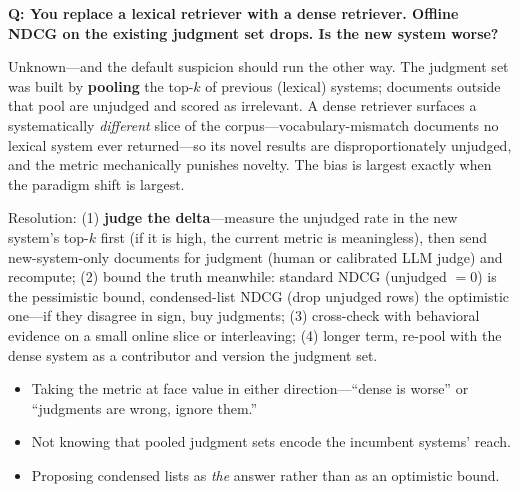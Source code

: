 \begin{interviewq}
\textbf{Q: You replace a lexical retriever with a dense retriever. Offline NDCG on the existing judgment set drops. Is the new system worse?}

 \quad {} \quad \badgefreq{\freqmed}

\stronganswer

Unknown---and the default suspicion should run the other way. The judgment set was built by \textbf{pooling} the top-$k$ of previous (lexical) systems; documents outside that pool are unjudged and scored as irrelevant. A dense retriever surfaces a systematically \textit{different} slice of the corpus---vocabulary-mismatch documents no lexical system ever returned---so its novel results are disproportionately unjudged, and the metric mechanically punishes novelty. The bias is largest exactly when the paradigm shift is largest.

Resolution: (1) \textbf{judge the delta}---measure the unjudged rate in the new system's top-$k$ first (if it is high, the current metric is meaningless), then send new-system-only documents for judgment (human or calibrated LLM judge) and recompute; (2) bound the truth meanwhile: standard NDCG (unjudged $= 0$) is the pessimistic bound, condensed-list NDCG (drop unjudged rows) the optimistic one---if they disagree in sign, buy judgments; (3) cross-check with behavioral evidence on a small online slice or interleaving; (4) longer term, re-pool with the dense system as a contributor and version the judgment set.

\redflags
\begin{itemize}
    \item Taking the metric at face value in either direction---``dense is worse'' or ``judgments are wrong, ignore them.''
    \item Not knowing that pooled judgment sets encode the incumbent systems' reach.
    \item Proposing condensed lists as \textit{the} answer rather than as an optimistic bound.
\end{itemize}


\end{interviewq}

